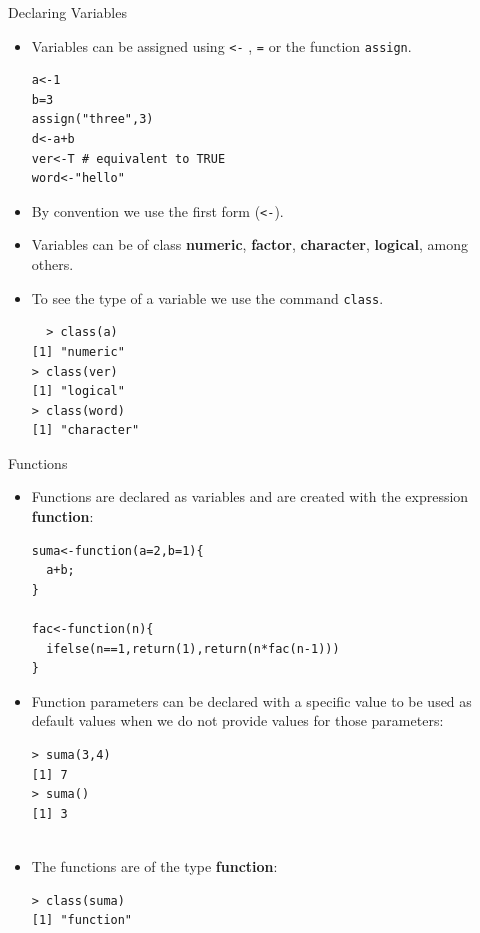 \documentclass[handout]{beamer}
\begin{document}
\begin{frame}[fragile]{Declaring Variables}
\scriptsize{
\begin{itemize}
 \item Variables can be assigned using \verb+<-+ , \verb+=+ or the function \verb+assign+.
 
  \begin{verbatim}
a<-1
b=3
assign("three",3)
d<-a+b
ver<-T # equivalent to TRUE
word<-"hello"
\end{verbatim}
 
 \item By convention we use the first form (\verb+<-+).
 
\item Variables can be of class \textbf{numeric}, \textbf{factor}, \textbf{character}, \textbf{logical}, among others.
 
\item To see the type of a variable we use the command \verb+class+.
 \begin{verbatim}
  > class(a) 
[1] "numeric"
> class(ver)
[1] "logical"
> class(word)
[1] "character"
 \end{verbatim}

 
 
\end{itemize}

}


\end{frame}


\begin{frame}[fragile]{Functions}
\scriptsize{
\begin{itemize}
 \item Functions are declared as variables and are created with the expression \textbf{function}:

\begin{verbatim}
suma<-function(a=2,b=1){
  a+b;
}

fac<-function(n){
  ifelse(n==1,return(1),return(n*fac(n-1)))    
}

\end{verbatim}

\item Function parameters can be declared with a specific value to be used as default values when we do not provide values for those parameters:
\begin{verbatim}
> suma(3,4)
[1] 7
> suma()
[1] 3
 
\end{verbatim}

\item The functions are of the type \textbf{function}:
\begin{verbatim}
> class(suma)
[1] "function" 
\end{verbatim}


\end{itemize}


 
} 
\end{frame}
\end{document}
